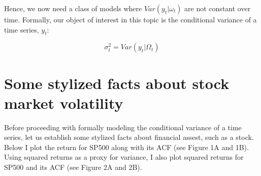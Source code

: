 \documentclass[]{book}
\theoremstyle{definition}
\theoremstyle{definition}
\theoremstyle{definition}
\theoremstyle{remark}
\begin{document}
Hence, we now need a class of models where \(Var(y_t|\omega_t)\) are not
constant over time. Formally, our object of interest in this topic is
the conditional variance of a time series, \(y_t\):

\[\sigma_t^2=Var(y_t|\Omega_t)\]

\hypertarget{some-stylized-facts-about-stock-market-volatility}{%
\section{Some stylized facts about stock market
volatility}\label{some-stylized-facts-about-stock-market-volatility}}

Before proceeding with formally modeling the conditional variance of a
time series, let us establish some stylized facts about financial
assest, such as a stock. Below I plot the return for SP500 along with
its ACF (see Figure 1A and 1B). Using squared returns as a proxy for
variance, I also plot squared returns for SP500 and its ACF (see Figure
2A and 2B).
\end{document}
